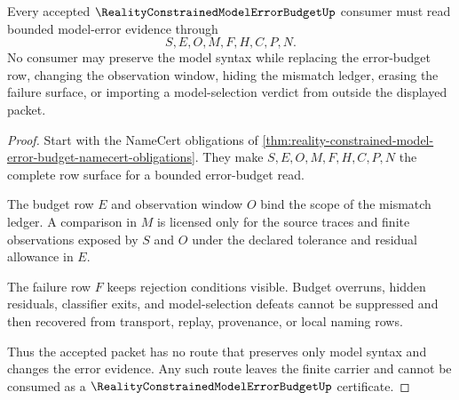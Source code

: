 \begin{theorem}
\label{thm:reality-constrained-model-error-budget-nonescape}
Every accepted $\RealityConstrainedModelErrorBudgetUp$ consumer must read bounded model-error evidence through
$$
S,E,O,M,F,H,C,P,N.
$$
No consumer may preserve the model syntax while replacing the error-budget row, changing the observation window, hiding the mismatch ledger, erasing the failure surface, or importing a model-selection verdict from outside the displayed packet.
\end{theorem}
\begin{proof}
Start with the NameCert obligations of \autoref{thm:reality-constrained-model-error-budget-namecert-obligations}. They make $S,E,O,M,F,H,C,P,N$ the complete row surface for a bounded error-budget read.

The budget row $E$ and observation window $O$ bind the scope of the mismatch ledger. A comparison in $M$ is licensed only for the source traces and finite observations exposed by $S$ and $O$ under the declared tolerance and residual allowance in $E$.

The failure row $F$ keeps rejection conditions visible. Budget overruns, hidden residuals, classifier exits, and model-selection defeats cannot be suppressed and then recovered from transport, replay, provenance, or local naming rows.

Thus the accepted packet has no route that preserves only model syntax and changes the error evidence. Any such route leaves the finite carrier and cannot be consumed as a $\RealityConstrainedModelErrorBudgetUp$ certificate.
\end{proof}


